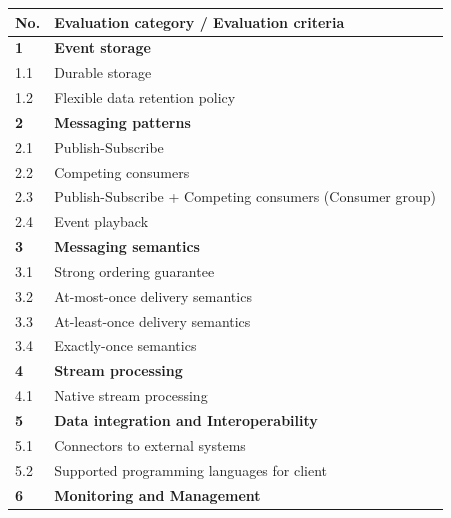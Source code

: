 \begin{table}[h]
	\centering
	\begin{tabular}{|l|l|}
		\hline
		\textbf{No.} & \textbf{Evaluation category / Evaluation criteria}       \\ \hline
		\textbf{1}   & \textbf{Event storage}                                   \\ \hline
		1.1          & Durable storage                                          \\ \hline
		1.2          & Flexible data retention policy                           \\ \hline
		\textbf{2}   & \textbf{Messaging patterns}                              \\ \hline
		2.1          & Publish-Subscribe                                        \\ \hline
		2.2          & Competing consumers                                      \\ \hline
		2.3          & Publish-Subscribe + Competing consumers (Consumer group) \\ \hline
		2.4          & Event playback                                           \\ \hline
		\textbf{3}   & \textbf{Messaging semantics}                             \\ \hline
		3.1          & Strong ordering guarantee                                \\ \hline
		3.2          & At-most-once delivery semantics                          \\ \hline
		3.3          & At-least-once delivery semantics                         \\ \hline
		3.4          & Exactly-once semantics                                   \\ \hline
		\textbf{4}   & \textbf{Stream processing}                               \\ \hline
		4.1          & Native stream processing                                 \\ \hline
		\textbf{5}   & \textbf{Data integration and Interoperability}           \\ \hline
		5.1          & Connectors to external systems                           \\ \hline
		5.2          & Supported programming languages for client               \\ \hline
		\textbf{6}   & \textbf{Monitoring and Management}                       \\ \hline

\end{tabular}
\end{table}
